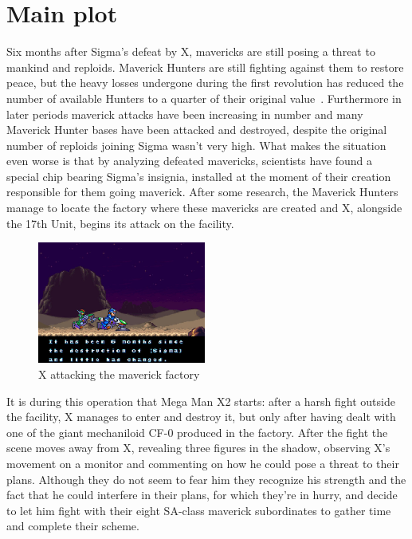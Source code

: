 \section{Main plot}
Six months after Sigma's defeat by X, mavericks are still posing a threat to mankind and reploids. Maverick Hunters are still fighting against them to restore peace, but the heavy losses undergone during the first revolution has reduced the number of available Hunters to a quarter of their original value~\cite{Xcoll1:Manual_X2}. Furthermore in later periods maverick attacks have been increasing in number and many Maverick Hunter bases have been attacked and destroyed, despite the original number of reploids joining Sigma wasn't very high. What makes the situation even worse is that by analyzing defeated mavericks, scientists have found a special chip bearing Sigma's insignia, installed at the moment of their creation responsible for them going maverick. After some research, the  Maverick Hunters manage to locate the factory where these mavericks are created and X, alongside the 17th Unit, begins its attack on the facility.
\begin{figure}[htp]
	\centering
	\includegraphics[height=4cm]{figures/X2/story_1.jpg}
	\caption {X attacking the maverick factory}
\end{figure}
It is during this operation that Mega Man X2 starts: after a harsh fight outside the facility, X manages to enter and destroy it, but only after having dealt with one of the giant mechaniloid CF-0 produced in the factory. After the fight the scene moves away from X, revealing three figures in the shadow, observing X's movement on a monitor and commenting on how he could pose a threat to their plans. Although they do not seem to fear him they recognize his strength and the fact that he could interfere in their plans, for which they're in hurry, and decide to let him fight with their eight SA-class maverick subordinates to gather time and complete their scheme.

